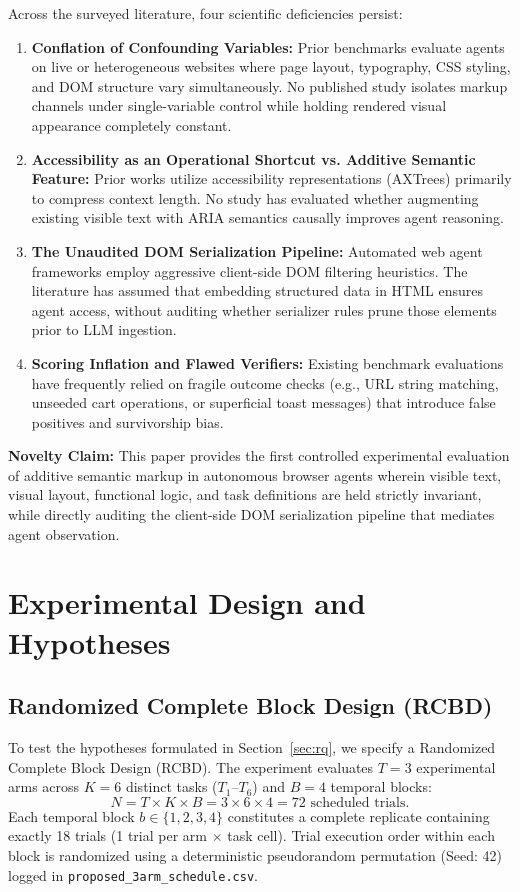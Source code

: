 \documentclass[11pt,a4paper]{article}
\begin{document}
Across the surveyed literature, four scientific deficiencies persist:
\begin{enumerate}
    \item \textbf{Conflation of Confounding Variables:} Prior benchmarks evaluate agents on live or heterogeneous websites where page layout, typography, CSS styling, and DOM structure vary simultaneously. No published study isolates markup channels under single-variable control while holding rendered visual appearance completely constant.
    \item \textbf{Accessibility as an Operational Shortcut vs. Additive Semantic Feature:} Prior works utilize accessibility representations (AXTrees) primarily to compress context length. No study has evaluated whether augmenting existing visible text with ARIA semantics causally improves agent reasoning.
    \item \textbf{The Unaudited DOM Serialization Pipeline:} Automated web agent frameworks employ aggressive client-side DOM filtering heuristics. The literature has assumed that embedding structured data in HTML ensures agent access, without auditing whether serializer rules prune those elements prior to LLM ingestion.
    \item \textbf{Scoring Inflation and Flawed Verifiers:} Existing benchmark evaluations have frequently relied on fragile outcome checks (e.g., URL string matching, unseeded cart operations, or superficial toast messages) that introduce false positives and survivorship bias.
\end{enumerate}

\textbf{Novelty Claim:} This paper provides the first controlled experimental evaluation of additive semantic markup in autonomous browser agents wherein visible text, visual layout, functional logic, and task definitions are held strictly invariant, while directly auditing the client-side DOM serialization pipeline that mediates agent observation.

\section{Experimental Design and Hypotheses}
\label{sec:design}

\subsection{Randomized Complete Block Design (RCBD)}
To test the hypotheses formulated in Section~\ref{sec:rq}, we specify a Randomized Complete Block Design (RCBD). The experiment evaluates $T=3$ experimental arms across $K=6$ distinct tasks ($T_1$--$T_6$) and $B=4$ temporal blocks:
\begin{equation}
N = T \times K \times B = 3 \times 6 \times 4 = 72 \text{ scheduled trials}.
\end{equation}
Each temporal block $b \in \{1, 2, 3, 4\}$ constitutes a complete replicate containing exactly 18 trials (1 trial per arm $\times$ task cell). Trial execution order within each block is randomized using a deterministic pseudorandom permutation (Seed: 42) logged in \texttt{proposed\_3arm\_schedule.csv}.
\end{document}
